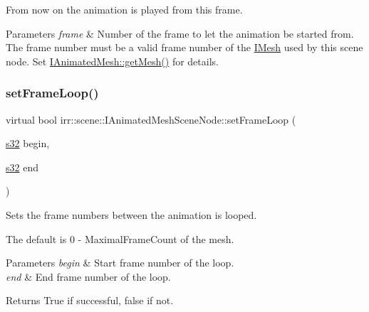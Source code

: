 From now on the animation is played from this frame. 
\begin{DoxyParams}{Parameters}
{\em frame} & Number of the frame to let the animation be started from. The frame number must be a valid frame number of the \hyperlink{classirr_1_1scene_1_1IMesh}{I\+Mesh} used by this scene node. Set \hyperlink{classirr_1_1scene_1_1IAnimatedMesh_adccb39fee83bed36a464cf7b96f3a0ca}{I\+Animated\+Mesh\+::get\+Mesh()} for details. \\
\hline
\end{DoxyParams}
\mbox{\label{classirr_1_1scene_1_1IAnimatedMeshSceneNode_a900400fe375ca13f48876b84900ffddf}} 
\subsubsection{\texorpdfstring{set\+Frame\+Loop()}{setFrameLoop()}}
{\footnotesize\ttfamily virtual bool irr\+::scene\+::\+I\+Animated\+Mesh\+Scene\+Node\+::set\+Frame\+Loop (\begin{DoxyParamCaption}\item[{\hyperlink{namespaceirr_ac66849b7a6ed16e30ebede579f9b47c6}{s32}}]{begin,  }\item[{\hyperlink{namespaceirr_ac66849b7a6ed16e30ebede579f9b47c6}{s32}}]{end }\end{DoxyParamCaption})\hspace{0.3cm}{\ttfamily [pure virtual]}}



Sets the frame numbers between the animation is looped. 

The default is 0 -\/ Maximal\+Frame\+Count of the mesh. 
\begin{DoxyParams}{Parameters}
{\em begin} & Start frame number of the loop. \\
\hline
{\em end} & End frame number of the loop. \\
\hline
\end{DoxyParams}
\begin{DoxyReturn}{Returns}
True if successful, false if not. 
\end{DoxyReturn}
\mbox{\label{classirr_1_1scene_1_1IAnimatedMeshSceneNode_ae6cae051c74c3953061aa9e49e10cd06}} 
